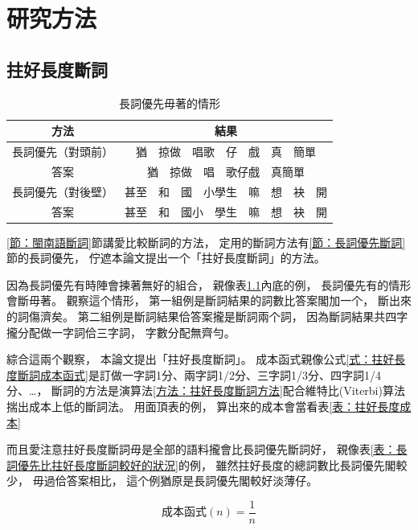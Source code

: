\chapter{研究方法}
\label{章：研究方法}

\section{拄好長度斷詞}
\label{節：拄好長度斷詞}

\begin{table}
\caption{長詞優先毋著的情形}
\label{表：長詞優先佇一寡例有問題}
\centering
\begin{tabular}{c|c}
方法 & 結果\\
\hline
長詞優先（對頭前） & 猶　掠做　唱歌　仔　戲　真　簡單\\
答案 & 猶　掠做　唱　歌仔戲　真簡單\\
\hline
長詞優先（對後壁） & 甚至　和　國　小學生　嘛　想　袂　開\\
答案 & 甚至　和　國小　學生　嘛　想　袂　開\\
\end{tabular}
\end{table}

\ref{節：閩南語斷詞}節講愛比較斷詞的方法，
定用的斷詞方法有\ref{節：長詞優先斷詞}節的長詞優先，
佇遮本論文提出一个「拄好長度斷詞」的方法。


因為長詞優先有時陣會揀著無好的組合，
親像表\ref{表：長詞優先佇一寡例有問題}內底的例，
長詞優先有的情形會斷毋著。
觀察這个情形，
第一組例是斷詞結果的詞數比答案閣加一个，
斷出來的詞傷濟矣。
第二組例是斷詞結果佮答案攏是斷詞兩个詞，
因為斷詞結果共四字攏分配做一字詞佮三字詞，
字數分配無齊勻。

綜合這兩个觀察，
本論文提出「拄好長度斷詞」。
成本函式親像公式\ref{式：拄好長度斷詞成本函式}是訂做一字詞1分、兩字詞1/2分、三字詞1/3分、四字詞1/4分、…，
斷詞的方法是演算法\ref{方法：拄好長度斷詞方法}配合維特比(Viterbi)算法揣出成本上低的斷詞法。
用面頂表的例，
算出來的成本會當看表\ref{表：拄好長度成本}

而且愛注意拄好長度斷詞毋是全部的語料攏會比長詞優先斷詞好，
親像表\ref{表：長詞優先比拄好長度斷詞較好的狀況}的例，
雖然拄好長度的總詞數比長詞優先閣較少，
毋過佮答案相比，
這个例猶原是長詞優先閣較好淡薄仔。

\begin{equation}
\label{式：拄好長度斷詞成本函式}
成本函式(n) = \frac{1}{n}
\end{equation}


